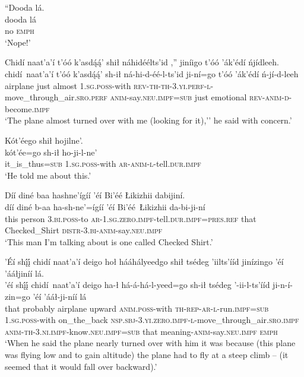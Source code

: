 \ea\label{ex:text9-11-8}
``Dooda lá.\\
\gll dooda	lá\\
     no	\textsc{emph}\\
\glt `Nope!'
\z

\largerpage
\ea\label{ex:text9-11-9}
Chidí naat’a’í t’óó k’asdą́ą́’ shił náhidéélts’id ,'' jiníigo t’óó ’ák’édí ńjídleeh.\\
\gll chidí~{naat’a’í}	t’óó	k’asdą́ą́’	sh-ił	ná-hi-d-éé-l-ts’id	ji-ní=go	t’óó	’ák’édí	ń-jí-d-leeh\\
     airplane	just	almost	1.\textsc{sg}.\textsc{poss}-with	\textsc{rev}-\textsc{th}-\textsc{th}-3.\textsc{yi}.\textsc{perf}-\textsc{l}-move\_through\_air.\textsc{sro}.\textsc{perf}	\textsc{anim}-say.\textsc{neu}.\textsc{impf}=\textsc{sub}	just	emotional	\textsc{rev}-\textsc{anim}-\textsc{d}-become.\textsc{impf}\\
\glt `The plane almost turned over with me (looking for it),'' he said with concern.'
\z

\ea\label{ex:text9-11-10}
Kót’éego shił hojilne’.\\
\gll kót’ée=go	sh-ił	ho-ji-l-ne’\\
     it\_is\_thus=\textsc{sub}	1.\textsc{sg}.\textsc{poss}-with	\textsc{ar}-\textsc{anim}-\textsc{l}-tell.\textsc{dur}.\textsc{impf}\\
\glt `He told me about this.'
\z

\ea\label{ex:text9-11-11}
Díí diné baa hashne’ígíí ’éí Bi’éé Łikizhii dabijiní.\\
\gll díí	diné	b-aa	ha-sh-ne’=ígíí	’éí	Bi’éé~{Łikizhii}	da-bi-ji-ní\\
     this	person	3.\textsc{bi}.\textsc{poss}-to	\textsc{ar}-1.\textsc{sg}.\textsc{zero}.\textsc{impf}-tell.\textsc{dur}.\textsc{impf}=\textsc{pres}.\textsc{ref}	that	Checked\_Shirt	\textsc{distr}-3.\textsc{bi}-\textsc{anim}-say.\textsc{neu}.\textsc{impf}\\
\glt `This man I'm talking about is one called Checked Shirt.'
\z

\ea\label{ex:text9-11-12}
’Éí shį́į́ chidí naat’a’í deigo hoł hááhályeedgo shił tsédeg ’iilts’ííd jinízingo ’éí ’ááłjiníí lá.\\
\gll ’éí	shį́į́	chidí~{naat’a’í}	deigo	ha-ł	há-á-há-l-yeed=go	sh-ił	tsédeg	’-ii-l-ts’ííd	ji-n-í-zin=go	’éí	’ááł-ji-níí	lá\\
     that	probably	airplane	upward	\textsc{anim}.\textsc{poss}-with	\textsc{th}-\textsc{rep}-\textsc{ar}-\textsc{l}-run.\textsc{impf}=\textsc{sub}	1.\textsc{sg}.\textsc{poss}-with	on\_the\_back	\textsc{nsp}.\textsc{sbj}-3.\textsc{yi}.\textsc{zero}.\textsc{impf}-\textsc{l}-move\_through\_air.\textsc{sro}.\textsc{impf}	\textsc{anim}-\textsc{th}-3.\textsc{ni}.\textsc{impf}-know.\textsc{neu}.\textsc{impf}=\textsc{sub}	that	meaning-\textsc{anim}-say.\textsc{neu}.\textsc{impf}	\textsc{emph}\\
\glt `When he said the plane nearly turned over with him it was because (this plane was flying low and to gain altitude) the plane had to fly at a steep climb -- (it seemed that it would fall over backward).'
\z

